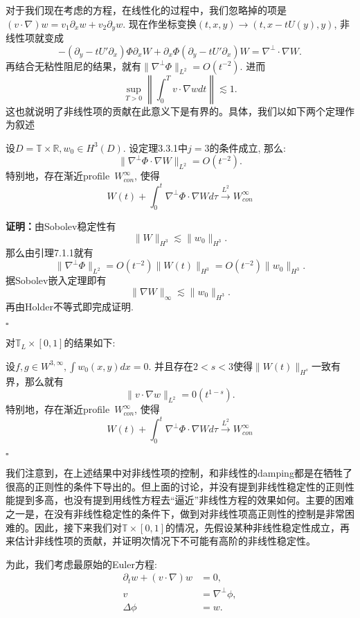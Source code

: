 对于我们现在考虑的方程，在线性化的过程中，我们忽略掉的项是$(v\cdot\nabla)w=v_1\partial_xw+v_2\partial_y w$. 现在作坐标变换$(t,x,y)\rightarrow(t,x-tU(y),y)$, 非线性项就变成$$-(\partial_y -tU'\partial_x)\Phi\partial_x W+\partial_x \Phi(\partial_y-tU'\partial_x)W=\nabla^{\perp}\cdot\nabla{W}.$$ 再结合无粘性阻尼的结果，就有$\|\nabla^{\perp}\Phi\|_{L^2}=O(t^{-2})$. 进而$$\sup_{T>0}\left\|\int_0^Tv\cdot\nabla w dt\right\|\lesssim 1.$$ 这也就说明了非线性项的贡献在此意义下是有界的。具体，我们以如下两个定理作为叙述

\begin{thm}\songti\rm
设$D=\mathbb{T}\times\mathbb{R}, w_0\in H^3(D)$. 设定理3.3.1中$j=3$的条件成立, 那么:
$$\|\nabla^{\perp}\Phi\cdot\nabla W\|_{L^2}=O(t^{-2}).$$ 特别地，存在渐近profile~$W_{con}^{\infty}$, 使得$$W(t)+\int_0^t\nabla^{\perp}\Phi\cdot\nabla Wd\tau\xrightarrow{L^2}W_{con}^{\infty}$$
\end{thm}

\textbf{证明：}由Sobolev稳定性有$$\|W\|_{H^3}\lesssim\|w_0\|_{H^3}.$$ 那么由引理7.1.1就有$$\|\nabla^{\perp}\Phi\|_{L^2}=O(t^{-2})\|W(t)\|_{H^3}=O(t^{-2})\|w_0\|_{H^3}.$$
据Sobolev嵌入定理即有$$\|\nabla W\|_{\infty}\lesssim\|w_0\|_{H^3}.$$ 再由Holder不等式即完成证明.
\begin{flushright}
$\square$
\end{flushright}

对$\mathbb{T}_L\times[0,1]$的结果如下:
\begin{thm}\songti\rm
设$f,g\in W^{3,\infty},\int w_0(x,y)dx=0$. 并且存在$2<s<3$使得$\|W(t)\|_{H^s}$一致有界，那么就有$$\|v\cdot\nabla w\|_{L^2}=0(t^{1-s}). $$特别地，存在渐近profile~$W_{con}^{\infty}$, 使得$$W(t)+\int_0^t\nabla^{\perp}\Phi\cdot\nabla Wd\tau\xrightarrow{L^2}W_{con}^{\infty}$$
\end{thm}
\begin{flushright}
$\square$
\end{flushright}

我们注意到，在上述结果中对非线性项的控制，和非线性的damping都是在牺牲了很高的正则性的条件下导出的。但上面的讨论，并没有提到非线性稳定性的正则性能提到多高，也没有提到用线性方程去“逼近”非线性方程的效果如何。主要的困难之一是，在没有非线性稳定性的条件下，做到对非线性项高正则性的控制是非常困难的。因此，接下来我们对$\mathbb{T}\times [0,1]$的情况，先假设某种非线性稳定性成立，再来估计非线性项的贡献，并证明次情况下不可能有高阶的非线性稳定性。

为此，我们考虑最原始的Euler方程:
\[
\begin{aligned}
\partial_tw+(v\cdot \nabla)w&=0, \\
v&=\nabla^{\perp}\phi, \\
\Delta\phi&=w.
\end{aligned}
\]


